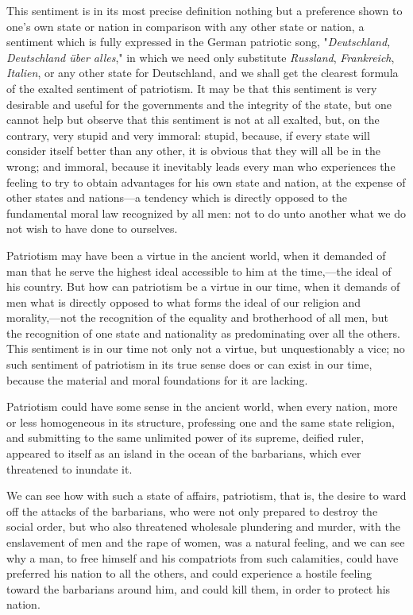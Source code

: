 \documentclass{book}
\begin{document}
This sentiment is in its most precise definition nothing but a preference shown to one’s own state or nation in comparison with any other state or nation, a sentiment which is fully expressed in the German patriotic song, "\emph{Deutschland, Deutschland über alles}," in which we need only substitute \emph{Russland}, \emph{Frankreich}, \emph{Italien}, or any other state for Deutschland, and we shall get the clearest formula of the exalted sentiment of patriotism. It may be that this sentiment is very desirable and useful for the governments and the integrity of the state, but one cannot help but observe that this sentiment is not at all exalted, but, on the contrary, very stupid and very immoral: stupid, because, if every state will consider itself better than any other, it is obvious that they will all be in the wrong; and immoral, because it inevitably leads every man who experiences the feeling to try to obtain advantages for his own state and nation, at the expense of other states and nations—a tendency which is directly opposed to the fundamental moral law recognized by all men: not to do unto another what we do not wish to have done to ourselves.

Patriotism may have been a virtue in the ancient world, when it demanded of man that he serve the highest ideal accessible to him at the time,—the ideal of his country. But how can patriotism be a virtue in our time, when it demands of men what is directly opposed to what forms the ideal of our religion and morality,—not the recognition of the equality and brotherhood of all men, but the recognition of one state and nationality as predominating over all the others. This sentiment is in our time not only not a virtue, but unquestionably a vice; no such sentiment of patriotism in its true sense does or can exist in our time, because the material and moral foundations for it are lacking.

Patriotism could have some sense in the ancient world, when every nation, more or less homogeneous in its structure, professing one and the same state religion, and submitting to the same unlimited power of its supreme, deified ruler, appeared to itself as an island in the ocean of the barbarians, which ever threatened to inundate it.

We can see how with such a state of affairs, patriotism, that is, the desire to ward off the attacks of the barbarians, who were not only prepared to destroy the social order, but who also threatened wholesale plundering and murder, with the enslavement of men and the rape of women, was a natural feeling, and we can see why a man, to free himself and his compatriots from such calamities, could have preferred his nation to all the others, and could experience a hostile feeling toward the barbarians around him, and could kill them, in order to protect his nation.
\end{document}
